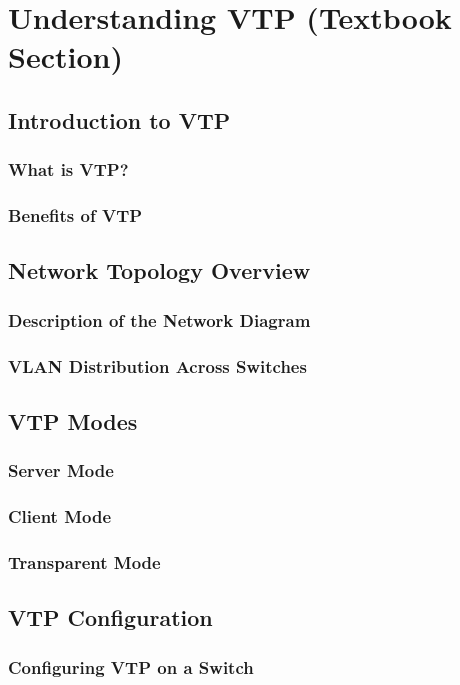 \documentclass{book}
\begin{document}
\tableofcontents

\chapter{Understanding VTP (Textbook Section)}
\section{Introduction to VTP}
\subsection{What is VTP?}
\subsection{Benefits of VTP}

\section{Network Topology Overview}
\subsection{Description of the Network Diagram}
\subsection{VLAN Distribution Across Switches}

\section{VTP Modes}
\subsection{Server Mode}
\subsection{Client Mode}
\subsection{Transparent Mode}

\section{VTP Configuration}
\subsection{Configuring VTP on a Switch}
\end{document}
